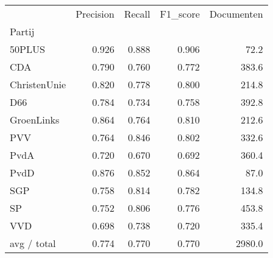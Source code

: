 \begin{tabular}{lrrrr}
\toprule
{} &  Precision &  Recall &  F1\_score &  Documenten \\
Partij       &            &         &           &             \\
\midrule
50PLUS       &      0.926 &   0.888 &     0.906 &        72.2 \\
   CDA       &      0.790 &   0.760 &     0.772 &       383.6 \\
ChristenUnie &      0.820 &   0.778 &     0.800 &       214.8 \\
   D66       &      0.784 &   0.734 &     0.758 &       392.8 \\
  GroenLinks &      0.864 &   0.764 &     0.810 &       212.6 \\
   PVV       &      0.764 &   0.846 &     0.802 &       332.6 \\
  PvdA       &      0.720 &   0.670 &     0.692 &       360.4 \\
  PvdD       &      0.876 &   0.852 &     0.864 &        87.0 \\
   SGP       &      0.758 &   0.814 &     0.782 &       134.8 \\
    SP       &      0.752 &   0.806 &     0.776 &       453.8 \\
   VVD       &      0.698 &   0.738 &     0.720 &       335.4 \\
 avg / total &      0.774 &   0.770 &     0.770 &      2980.0 \\
\bottomrule
\end{tabular}
